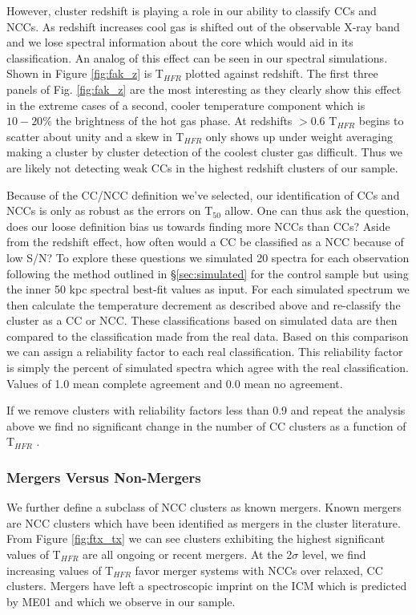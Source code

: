 \documentclass{emulateapj}
\newcommand{\tf}{T$_{HFR}$ }
\begin{document}
However, cluster redshift is playing a role in our ability to classify
CCs and NCCs. As redshift increases cool gas is shifted out of the
observable X-ray band and we lose spectral information about the core
which would aid in its classification. An analog of this effect can be
seen in our spectral simulations. Shown in Figure \ref{fig:fak_z} is
\tf plotted against redshift. The first three panels of
Fig. \ref{fig:fak_z} are the most interesting as they clearly show
this effect in the extreme cases of a second, cooler temperature
component which is $10-20\%$ the brightness of the hot gas phase. At
redshifts $> 0.6$ \tf begins to scatter about unity and a skew in
\tf only shows up under weight averaging making a cluster by cluster
detection of the coolest cluster gas difficult. Thus we are likely
not detecting weak CCs in the highest redshift clusters of our sample.

Because of the CC/NCC definition we've selected, our identification of
CCs and NCCs is only as robust as the errors on T$_{50}$ allow. One can
thus ask the question, does our loose definition bias us towards
finding more NCCs than CCs? Aside from the redshift effect, how often
would a CC be classified as a NCC because of low S/N? To explore these
questions we simulated 20 spectra for each observation following the
method outlined in \S\ref{sec:simulated} for the control sample but
using the inner 50 kpc spectral best-fit values as input. For each
simulated spectrum we then calculate the temperature decrement as
described above and re-classify the cluster as a CC or NCC. These
classifications based on simulated data are then compared to the
classification made from the real data. Based on this comparison we
can assign a reliability factor to each real classification. This
reliability factor is simply the percent of simulated spectra which
agree with the real classification. Values of 1.0 mean complete
agreement and 0.0 mean no agreement.

If we remove clusters with reliability factors less than 0.9 and
repeat the analysis above we find no significant change in the number
of CC clusters as a function of \tf.

\subsubsection{Mergers Versus Non-Mergers}\label{sec:merge}

We further define a subclass of NCC clusters as known mergers. Known
mergers are NCC clusters which have been identified as mergers in the
cluster literature. From Figure \ref{fig:ftx_tx} we can see clusters
exhibiting the highest significant values of \tf are all ongoing or
recent mergers. At the 2$\sigma$ level, we find increasing values of
\tf favor merger systems with NCCs over relaxed, CC clusters. Mergers
have left a spectroscopic imprint on the ICM which is predicted by
ME01 and which we observe in our sample.
\end{document}
